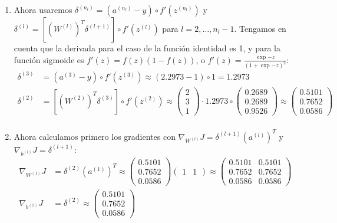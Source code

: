 \begin{enumerate}
\item Ahora usaremos $\delta^{(n_l)} = (a^{(n_l)} - y) \circ f'(z^{(n_l)})$ y $\delta^{(l)} = [(W^{(l)})^T\delta^{(l+1)}] \circ f'(z^{(l)})$ para $l = 2, \dots, n_l - 1$. Tengamos en cuenta que la derivada para el caso de la función identidad es 1, y para la función sigmoide es $f'(z) = f(z)(1 - f(z))$, o $f'(z) = \frac{\exp{-z}}{(1 + \exp{-z})^2}$:
\begin{align*}
\delta^{(3)} &= (a^{(3)} - y) \circ f'(z^{(3)}) \approx (2.2973 - 1) \circ 1 = 1.2973 \\
\delta^{(2)} &= [(W^{(2)})^T\delta^{(3)}] \circ f'(z^{(2)}) \approx \begin{pmatrix} 2 \\ 3 \\ 1 \end{pmatrix}\cdot 1.2973 \circ \begin{pmatrix} 0.2689 \\ 0.2689 \\ 0.9526 \end{pmatrix} \approx \begin{pmatrix} 0.5101 \\ 0.7652 \\ 0.0586 \end{pmatrix} \\
\end{align*}
\item Ahora calculamos primero los gradientes con $\nabla_{W^{(l)}} J = \delta^{(l+1)} (a^{(l)})^T$ y $\nabla_{b^{(l)}} J = \delta^{(l+1)}$:
\begin{align*}
\nabla_{W^{(1)}} J &= \delta^{(2)} (a^{(1)})^T \approx \begin{pmatrix} 0.5101 \\ 0.7652 \\ 0.0586 \end{pmatrix} \begin{pmatrix} 1 & 1 \end{pmatrix} \approx \begin{pmatrix} 0.5101 & 0.5101 \\ 0.7652 & 0.7652 \\ 0.0586 & 0.0586 \end{pmatrix} \\
\nabla_{b^{(1)}} J &= \delta^{(2)} \approx \begin{pmatrix} 0.5101 \\ 0.7652 \\ 0.0586 \end{pmatrix} \\

\end{align*}
\end{enumerate}
